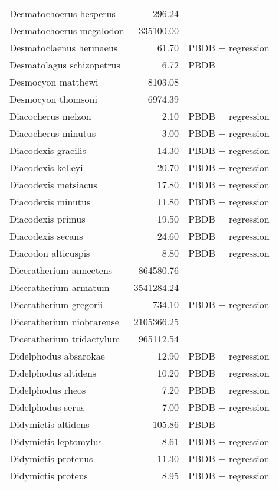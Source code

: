 \begin{table}[ht]
\begin{tabular}{lrl}
  Desmatochoerus hesperus & 296.24 & \cite{McGrew1939} \\ 
  Desmatochoerus megalodon & 335100.00 & \cite{McKenna2011} \\ 
  Desmatoclaenus hermaeus & 61.70 & PBDB + regression \\ 
  Desmatolagus schizopetrus & 6.72 & PBDB \\ 
  Desmocyon matthewi & 8103.08 & \cite{Tomiya2013} \\ 
  Desmocyon thomsoni & 6974.39 & \cite{Tomiya2013} \\ 
  Diacocherus meizon & 2.10 & PBDB + regression \\ 
  Diacocherus minutus & 3.00 & PBDB + regression \\ 
  Diacodexis gracilis & 14.30 & PBDB + regression \\ 
  Diacodexis kelleyi & 20.70 & PBDB + regression \\ 
  Diacodexis metsiacus & 17.80 & PBDB + regression \\ 
  Diacodexis minutus & 11.80 & PBDB + regression \\ 
  Diacodexis primus & 19.50 & PBDB + regression \\ 
  Diacodexis secans & 24.60 & PBDB + regression \\ 
  Diacodon alticuspis & 8.80 & PBDB + regression \\ 
  Diceratherium annectens & 864580.76 & \cite{Tomiya2013} \\ 
  Diceratherium armatum & 3541284.24 & \cite{Tomiya2013} \\ 
  Diceratherium gregorii & 734.10 & PBDB + regression \\ 
  Diceratherium niobrarense & 2105366.25 & \cite{Tomiya2013} \\ 
  Diceratherium tridactylum & 965112.54 & \cite{Tomiya2013} \\ 
  Didelphodus absarokae & 12.90 & PBDB + regression \\ 
  Didelphodus altidens & 10.20 & PBDB + regression \\ 
  Didelphodus rheos & 7.20 & PBDB + regression \\ 
  Didelphodus serus & 7.00 & PBDB + regression \\ 
  Didymictis altidens & 105.86 & PBDB \\ 
  Didymictis leptomylus & 8.61 & PBDB + regression \\ 
  Didymictis protenus & 11.30 & PBDB + regression \\ 
  Didymictis proteus & 8.95 & PBDB + regression \\ 

\end{tabular}
\end{table}
